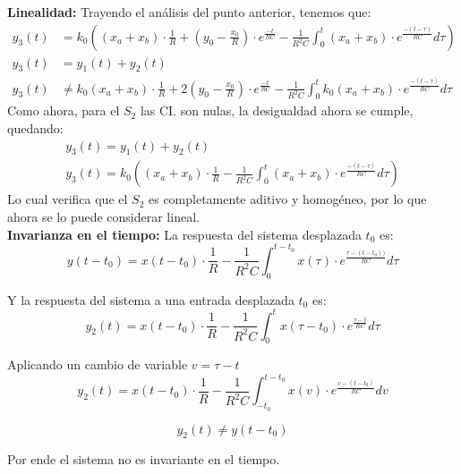 \documentclass[12pt,a4paper]{report}
\begin{document}
\begin{enumerate}[label=\alph*)]
      \textbf{Linealidad:} Trayendo el análisis del punto anterior, tenemos que:
      \begin{align*}
        y_3(t) &= k_0\left((x_a + x_b) \cdot \frac{1}{R} + \left(y_0 - \frac{x_0}{R}\right) \cdot e^{\frac{-t}{RC}} -
          \frac{1}{R^2C} \int_{0}^{t} (x_a + x_b) \cdot e^{\frac{-(t-\tau)}{RC}} d\tau\right)\\[12pt]
        y_3(t) &= y_1(t) + y_2(t)\\[6pt]
        y_3(t) &\neq k_0(x_a + x_b) \cdot \frac{1}{R} + 2\left(y_0 - \frac{x_0}{R}\right) \cdot
          e^{\frac{-t}{RC}} - \frac{1}{R^2C} \int_{0}^{t} k_0(x_a + x_b) \cdot e^{\frac{-(t-\tau)}{RC}} d\tau
      \end{align*}
      Como ahora, para el $S_2$ las CI. son nulas, la desigualdad ahora se cumple, quedando:
      \begin{gather*}
        y_3(t) = y_1(t) + y_2(t)\\[6pt]
        y_3(t) = k_0\left((x_a + x_b) \cdot \frac{1}{R} - \frac{1}{R^2C} \int_{0}^{t} (x_a + x_b) \cdot
        e^{\frac{-(t-\tau)}{RC}} d\tau\right)
      \end{gather*}
      Lo cual verifica que el $S_2$ es completamente aditivo y homogéneo, por lo que ahora se lo puede considerar
      lineal.\\

      \textbf{Invarianza en el tiempo:} La respuesta del sistema desplazada $t_0$ es:
      $$y(t - t_0) = x(t - t_0) \cdot \frac{1}{R}- \frac{1}{R^2C} \int_{0}^{t - t_0} x(\tau) \cdot
      e^{\frac{\tau-(t - t_0))}{RC}} d\tau$$

      Y la respuesta del sistema a una entrada desplazada $t_0$ es:
      $$y_2(t) = x(t-t_0) \cdot \frac{1}{R}- \frac{1}{R^2C} \int_{0}^{t} x(\tau - t_0) \cdot
      e^{\frac{\tau-t}{RC}} d\tau$$

      Aplicando un cambio de variable $v= \tau-t$
      $$y_2(t) = x(t-t_0) \cdot \frac{1}{R}- \frac{1}{R^2C} \int_{-t_0}^{t-t_0} x(v) \cdot
      e^{\frac{v-(t-t_0)}{RC}} dv$$

      $$y_2(t) \neq y(t-t_0)$$

      Por ende el sistema no es invariante en el tiempo.


\end{enumerate}
\end{document}

